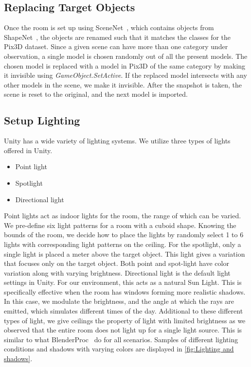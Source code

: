 \subsection{Replacing Target Objects}\label{subsec:implementation_replacing-target-objects}
Once the room is set up using SceneNet~\cite{McCormac2017}, which contains objects from ShapeNet~\cite{shapenet2015}, the objects are renamed such that it matches the classes for the Pix3D dataset.
Since a given scene can have more than one category under observation, a single model is chosen randomly out of all the present models.
The chosen model is replaced with a model in Pix3D of the same category by making it invisible using \emph{GameObject.SetActive}.
If the replaced model intersects with any other models in the scene, we make it invisible.
After the snapshot is taken, the scene is reset to the original, and the next model is imported.


\subsection{Setup Lighting}\label{subsec:implementation_lighting}

Unity has a wide variety of lighting systems.
We utilize three types of lights offered in Unity.

\begin{itemize}
    \item Point light
    \item Spotlight
    \item Directional light
\end{itemize}

Point lights act as indoor lights for the room, the range of which can be varied.
We pre-define six light patterns for a room with a cuboid shape.
Knowing the bounds of the room, we decide how to place the lights by randomly select 1 to 6 lights with corresponding light patterns on the ceiling.
For the spotlight, only a single light is placed a meter above the target object.
This light gives a variation that focuses only on the target object.
Both point and spot-light have color variation along with varying brightness.
Directional light is the default light settings in Unity.
For our environment, this acts as a natural Sun Light.
This is specifically effective when the room has windows forming more realistic shadows.
In this case, we modulate the brightness, and the angle at which the rays are emitted, which simulates different times of the day.
Additional to these different types of light, we give ceilings the property of light with limited brightness as we observed that the entire room does not light up for a single light source.
This is similar to what BlenderProc~\cite{dlr139317} do for all scenarios.
Samples of different lighting conditions and shadows with varying colors are displayed in \autoref{fig:Lighting and shadows}.


